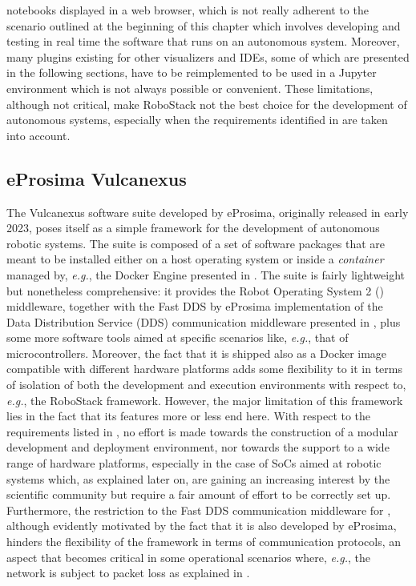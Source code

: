 notebooks displayed in a web browser, which is not really adherent to the scenario outlined at the beginning of this chapter which involves developing and testing in real time the software that runs on an autonomous system. Moreover, many plugins existing for other visualizers and IDEs, some of which are presented in the following sections, have to be reimplemented to be used in a Jupyter environment which is not always possible or convenient. These limitations, although not critical, make RoboStack not the best choice for the development of autonomous systems, especially when the requirements identified in  are taken into account.

\subsection{eProsima Vulcanexus}
\label{sec:related_work_vulcanexus}
The Vulcanexus software suite \cite{eprosima_vulcanexus_nodate} developed by eProsima, originally released in early 2023, poses itself as a simple framework for the development of autonomous robotic systems. The suite is composed of a set of software packages that are meant to be installed either on a host operating system or inside a \emph{container} managed by, \emph{e.g.}, the Docker Engine presented in . The suite is fairly lightweight but nonetheless comprehensive: it provides the Robot Operating System 2 (\ROS) middleware, together with the Fast DDS by eProsima \cite{eprosima_fast_nodate} implementation of the Data Distribution Service (DDS) communication middleware presented in , plus some more software tools aimed at specific scenarios like, \emph{e.g.}, that of microcontrollers. Moreover, the fact that it is shipped also as a Docker image compatible with different hardware platforms adds some flexibility to it in terms of isolation of both the development and execution environments with respect to, \emph{e.g.}, the RoboStack framework. However, the major limitation of this framework lies in the fact that its features more or less end here. With respect to the requirements listed in , no effort is made towards the construction of a modular development and deployment environment, nor towards the support to a wide range of hardware platforms, especially in the case of SoCs aimed at robotic systems which, as explained later on, are gaining an increasing interest by the scientific community but require a fair amount of effort to be correctly set up. Furthermore, the restriction to the Fast DDS communication middleware for \ROS, although evidently motivated by the fact that it is also developed by eProsima, hinders the flexibility of the framework in terms of communication protocols, an aspect that becomes critical in some operational scenarios where, \emph{e.g.}, the network is subject to packet loss as explained in .

